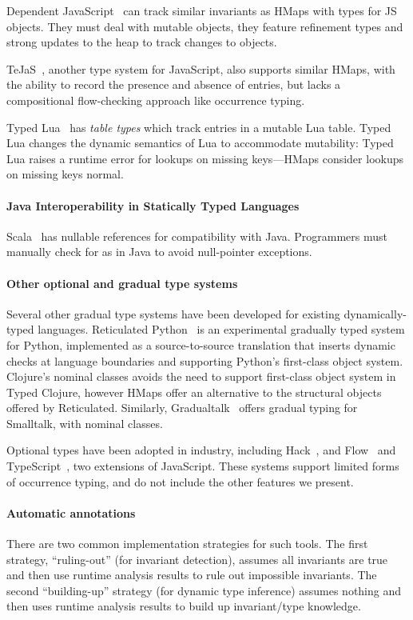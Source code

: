 \documentclass[9pt]{extarticle}
\begin{document}
Dependent JavaScript~\cite{Chugh:2012:DTJ} can track similar
invariants as HMaps with types for JS objects. They must deal with
mutable objects, they feature refinement types and strong updates to
the heap to track changes to objects.

TeJaS~\cite{TeJaS}, another type system for JavaScript,
also supports similar HMaps, with the ability to
record the presence and absence of entries, but lacks a compositional
flow-checking approach like occurrence typing.

Typed Lua~\cite{Maidl:2014:TLO} has \emph{table types} which track
entries in a mutable Lua table.  Typed Lua changes the dynamic
semantics of Lua to accommodate mutability: Typed Lua raises a runtime
error for lookups on missing keys---HMaps consider lookups on missing
keys normal.

\paragraph{Java Interoperability in Statically Typed Languages}
Scala~\cite{OCD+} has nullable references for compatibility with Java.
Programmers must manually check for
 as in Java to avoid null-pointer exceptions. 


\paragraph{Other optional and gradual type systems}
Several other gradual type
systems have been developed for existing
dynamically-typed languages.  Reticulated Python~\cite{Vitousek14} is
an experimental gradually typed system for Python, implemented as a
source-to-source translation that inserts dynamic checks at language
boundaries and supporting Python's first-class object system. 
Clojure's nominal classes avoids the need to support
first-class object system in Typed Clojure, however HMaps offer an alternative to
the structural objects offered by Reticulated. Similarly,
Gradualtalk~\cite{gradualtalk} offers gradual typing for Smalltalk,
with nominal classes.

Optional types
have been  adopted in industry, including Hack~\cite{hack}, and Flow~\cite{flow} and
TypeScript~\cite{typescript}, two extensions of JavaScript. These
systems  support  limited forms of occurrence typing,
and do not include the other features we
present.

\paragraph{Automatic annotations}
There are two common implementation strategies for such tools. The first
strategy, ``ruling-out'' (for invariant detection), assumes all invariants are true 
and then use runtime analysis results to rule out
impossible invariants. The second ``building-up'' strategy (for dynamic type inference)
assumes nothing and then uses runtime analysis results to build up invariant/type knowledge.
\end{document}
